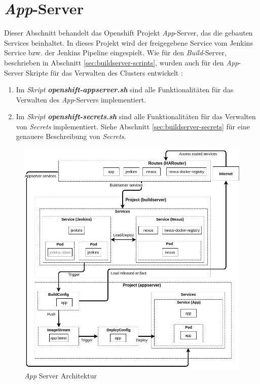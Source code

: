 \section{\emph{App}-Server}
\label{sec:appserver}
Dieser Abschnitt behandelt das Openshift Projekt \emph{App}-Server, das die gebauten Services beinhaltet. In dieses Projekt wird der freigegebene Service vom Jenkins Service bzw. der Jenkins Pipeline eingespielt. Wie für den \emph{Build}-Server, beschrieben in Abschnitt \ref{sec:buildserver-scripts}, wurden auch für den \emph{App}-Server Skripte für das Verwalten des Clusters entwickelt :
\begin{enumerate}
	\item Im \emph{Skript} \textbf{\emph{openshift-appserver.sh}} sind alle Funktionalitäten für das Verwalten des \emph{App}-Servers implementiert.
	\item Im \emph{Skript} \textbf{\emph{openshift-secrets.sh}} sind alle Funktionalitäten für das Verwalten von \emph{Secrets} implementiert. Siehe Abschnitt \ref{sec:buildserver-secrets} für eine genauere Beschreibung von \emph{Secrets}.
\end{enumerate}

\begin{figure}[H]
	\centering
	\includegraphics[scale=0.4]{logos/architecture-diagram-appserver.jpg}
	\caption{\emph{App} Server Architektur}
	\label{fig:appserver}
\end{figure}
\ \newpage

